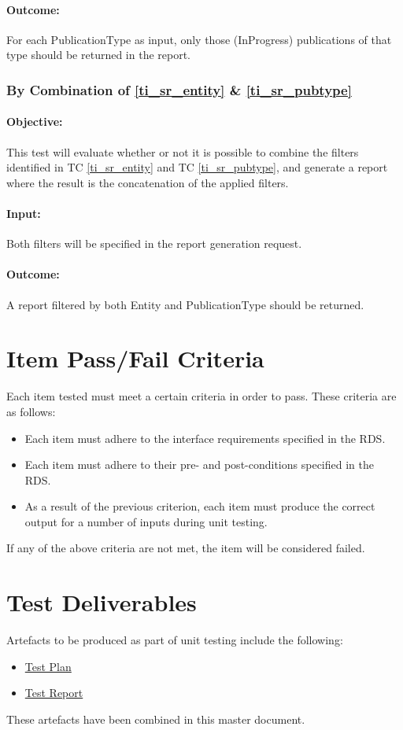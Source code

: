 \paragraph{Outcome:}
For each PublicationType as input, only those (InProgress) publications of that type should be returned in the report.

\subsubsection{By Combination of \ref{ti_sr_entity} \& \ref{ti_sr_pubtype}} \label{ti_sr_com}
\paragraph{Objective:}
This test will evaluate whether or not it is possible to combine the filters identified in TC \ref{ti_sr_entity} and TC \ref{ti_sr_pubtype}, and generate a report where the result is the concatenation of the applied filters.
\paragraph{Input:}
Both filters will be specified in the report generation request.
\paragraph{Outcome:}
A report filtered by both Entity and PublicationType should be returned.

\section{Item Pass/Fail Criteria}
\label{sec:passFailCrit}

Each item tested must meet a certain criteria in order to pass. These criteria are as follows:
\begin{itemize}
	\item Each item must adhere to the interface requirements specified in the RDS.
	\item Each item must adhere to their pre- and post-conditions specified in the RDS.
	\item As a result of the previous criterion, each item must produce the correct output for a number of inputs during unit testing.
\end{itemize}
If any of the above criteria are not met, the item will be considered failed.

\section{Test Deliverables}
\label{sec:testDeliverables}
Artefacts to be produced as part of unit testing include the following:
\begin{itemize}
	\item \hyperlink{labelp}{Test Plan}
	\item \hyperlink{labelr}{Test Report}
\end{itemize}
These artefacts have been combined in this master document.

